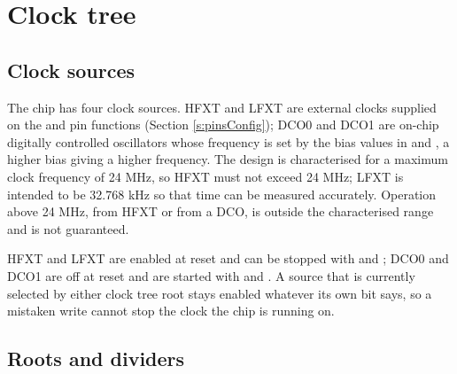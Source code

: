 \section{Clock tree} \label{s:clocktree}

\subsection{Clock sources}

The chip has four clock sources. HFXT and LFXT are external clocks supplied on the  and  pin functions (Section \ref{s:pinsConfig}); DCO0 and DCO1 are on-chip digitally controlled oscillators whose frequency is set by the bias values in  and , a higher bias giving a higher frequency. The design is characterised for a maximum clock frequency of 24 MHz, so HFXT must not exceed 24 MHz; LFXT is intended to be 32.768 kHz so that time can be measured accurately. Operation above 24 MHz, from HFXT or from a DCO, is outside the characterised range and is not guaranteed.

HFXT and LFXT are enabled at reset and can be stopped with  and ; DCO0 and DCO1 are off at reset and are started with  and . A source that is currently selected by either clock tree root stays enabled whatever its own bit says, so a mistaken write cannot stop the clock the chip is running on.

\subsection{Roots and dividers}

